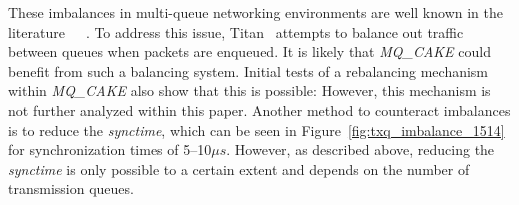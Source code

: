 These imbalances in multi-queue networking environments are well known in the literature~\cite{titan}~\cite{loom}~\cite{silo}.
%
To address this issue, Titan~\cite{titan} attempts to balance out traffic between queues when packets are enqueued.
%
It is likely that \textit{MQ\_CAKE} could benefit from such a balancing system.
%
Initial tests of a rebalancing mechanism within \textit{MQ\_CAKE} also show that this is possible: However, this mechanism is not further analyzed within this paper.
%
Another method to counteract imbalances is to reduce the \textit{synctime}, which can be seen in Figure~\ref{fig:txq_imbalance_1514} for synchronization times of 5--10$\mu s$. However, as described above, reducing the \textit{synctime} is only possible to a certain extent and depends on the number of transmission queues.
%
